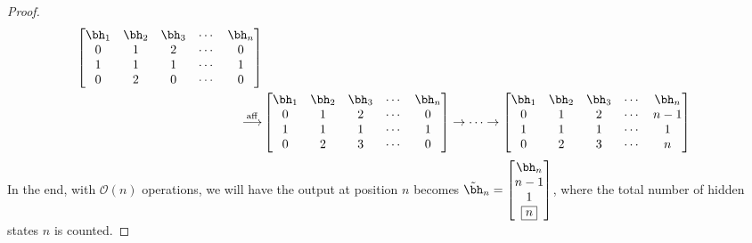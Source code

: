 \begin{proof}
\begin{equation}
\begin{aligned}
\begin{bmatrix}
        \bh_1 & \bh_2 & \bh_3 &\cdots &  \bh_n \\
        0 & 1 & 2 & \cdots & 0 \\
        1 & 1 & 1 & \cdots & 1 \\
        0 & 2 & 0 &\cdots & 0 
    \end{bmatrix} \\
    \overset{\mathrm{aff}}{\longrightarrow} & \begin{bmatrix}
        \bh_1 & \bh_2 &\bh_3 & \cdots &  \bh_n \\
        0 & 1 & 2 & \cdots & 0 \\
        1 & 1 & 1 & \cdots & 1 \\
        0 & 2 & 3 & \cdots & 0 
    \end{bmatrix} \rightarrow \cdots \rightarrow \begin{bmatrix}
        \bh_1 & \bh_2 &\bh_3 & \cdots &  \bh_n \\
        0 & 1 & 2 & \cdots & n-1 \\
        1 & 1 & 1 & \cdots & 1 \\
        0 & 2 & 3 & \cdots & n
    \end{bmatrix}
\end{aligned}
\end{equation}
In the end, with $\mathcal O(n)$ operations, we will have the output at position $n$ becomes $
    \tilde{\bh}_n = \begin{bmatrix}
    \bh_n \\ n-1  \\ 1 \\ \boxed{n}
    \end{bmatrix}$, where the total number of hidden states $n$ is counted. 
\end{proof}

